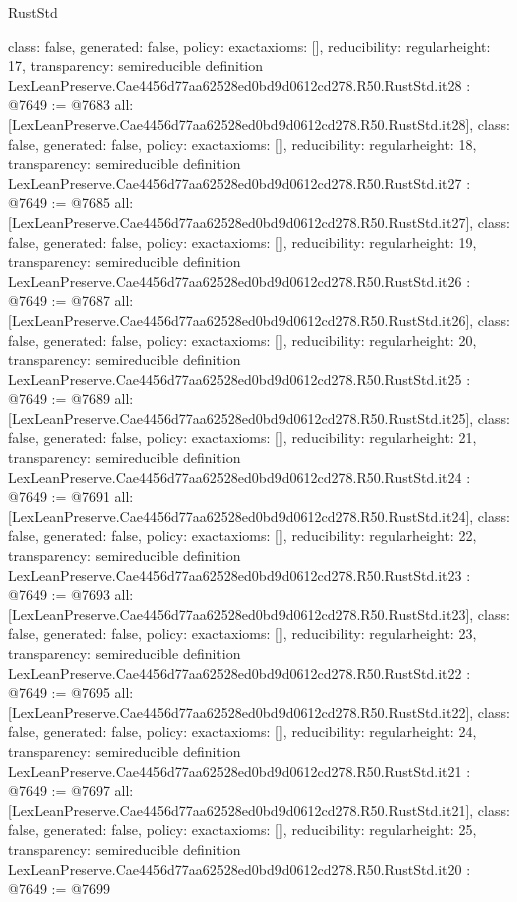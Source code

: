 \begin{lexlean}{RustStd}
\begin{coremodule}
{  class: false,
  generated: false,
  policy: exact{axioms: []},
  reducibility: regular{height: 17},
  transparency: semireducible
}
definition LexLeanPreserve.Cae4456d77aa62528ed0bd9d0612cd278.R50.RustStd.it28 : @7649 := @7683 {
  all: [LexLeanPreserve.Cae4456d77aa62528ed0bd9d0612cd278.R50.RustStd.it28],
  class: false,
  generated: false,
  policy: exact{axioms: []},
  reducibility: regular{height: 18},
  transparency: semireducible
}
definition LexLeanPreserve.Cae4456d77aa62528ed0bd9d0612cd278.R50.RustStd.it27 : @7649 := @7685 {
  all: [LexLeanPreserve.Cae4456d77aa62528ed0bd9d0612cd278.R50.RustStd.it27],
  class: false,
  generated: false,
  policy: exact{axioms: []},
  reducibility: regular{height: 19},
  transparency: semireducible
}
definition LexLeanPreserve.Cae4456d77aa62528ed0bd9d0612cd278.R50.RustStd.it26 : @7649 := @7687 {
  all: [LexLeanPreserve.Cae4456d77aa62528ed0bd9d0612cd278.R50.RustStd.it26],
  class: false,
  generated: false,
  policy: exact{axioms: []},
  reducibility: regular{height: 20},
  transparency: semireducible
}
definition LexLeanPreserve.Cae4456d77aa62528ed0bd9d0612cd278.R50.RustStd.it25 : @7649 := @7689 {
  all: [LexLeanPreserve.Cae4456d77aa62528ed0bd9d0612cd278.R50.RustStd.it25],
  class: false,
  generated: false,
  policy: exact{axioms: []},
  reducibility: regular{height: 21},
  transparency: semireducible
}
definition LexLeanPreserve.Cae4456d77aa62528ed0bd9d0612cd278.R50.RustStd.it24 : @7649 := @7691 {
  all: [LexLeanPreserve.Cae4456d77aa62528ed0bd9d0612cd278.R50.RustStd.it24],
  class: false,
  generated: false,
  policy: exact{axioms: []},
  reducibility: regular{height: 22},
  transparency: semireducible
}
definition LexLeanPreserve.Cae4456d77aa62528ed0bd9d0612cd278.R50.RustStd.it23 : @7649 := @7693 {
  all: [LexLeanPreserve.Cae4456d77aa62528ed0bd9d0612cd278.R50.RustStd.it23],
  class: false,
  generated: false,
  policy: exact{axioms: []},
  reducibility: regular{height: 23},
  transparency: semireducible
}
definition LexLeanPreserve.Cae4456d77aa62528ed0bd9d0612cd278.R50.RustStd.it22 : @7649 := @7695 {
  all: [LexLeanPreserve.Cae4456d77aa62528ed0bd9d0612cd278.R50.RustStd.it22],
  class: false,
  generated: false,
  policy: exact{axioms: []},
  reducibility: regular{height: 24},
  transparency: semireducible
}
definition LexLeanPreserve.Cae4456d77aa62528ed0bd9d0612cd278.R50.RustStd.it21 : @7649 := @7697 {
  all: [LexLeanPreserve.Cae4456d77aa62528ed0bd9d0612cd278.R50.RustStd.it21],
  class: false,
  generated: false,
  policy: exact{axioms: []},
  reducibility: regular{height: 25},
  transparency: semireducible
}
definition LexLeanPreserve.Cae4456d77aa62528ed0bd9d0612cd278.R50.RustStd.it20 : @7649 := @7699 {
}
\end{coremodule}
\end{lexlean}
